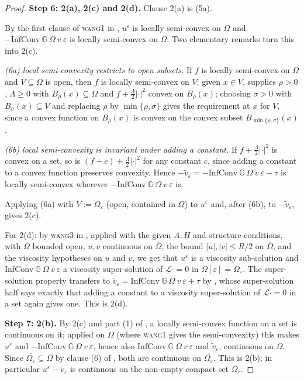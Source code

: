 \begin{proof}
\medskip\noindent\textbf{Step 6: 2(a), 2(c) and 2(d).} Clause 2(a) is (5a).

By the first clause of \textsc{wang1} in ,
$u^{\varepsilon}$ is locally semi-convex on $\Omega$ and
$-\mathrm{InfConv}\ \mathbb G\ \Omega\ v\ \varepsilon$ is locally semi-convex on $\Omega$.
Two elementary remarks turn this into 2(c).

\emph{(6a) local semi-convexity restricts to open subsets.} If $f$ is locally semi-convex on
$\Omega$ and $V\subseteq\Omega$ is open, then $f$ is locally semi-convex on $V$: given
$x\in V$,  supplies $\rho>0$, $\Lambda\ge0$ with
$B_\rho(x)\subseteq\Omega$ and $f+\tfrac\Lambda2|\cdot|^{2}$ convex on $B_\rho(x)$; choosing
$\sigma>0$ with $B_\sigma(x)\subseteq V$ and replacing $\rho$ by $\min\{\rho,\sigma\}$ gives
the requirement at $x$ for $V$, since a convex function on $B_\rho(x)$ is convex on the
convex subset $B_{\min\{\rho,\sigma\}}(x)$.

\emph{(6b) local semi-convexity is invariant under adding a constant.} If
$f+\tfrac\Lambda2|\cdot|^{2}$ is convex on a set, so is
$(f+c)+\tfrac\Lambda2|\cdot|^{2}$ for any constant $c$, since adding a constant to a convex
function preserves convexity. Hence $-\tilde v_{\varepsilon}
=-\mathrm{InfConv}\ \mathbb G\ \Omega\ v\ \varepsilon-\tau$ is locally semi-convex wherever
$-\mathrm{InfConv}\ \mathbb G\ \Omega\ v\ \varepsilon$ is.

Applying (6a) with $V:=\Omega_\varepsilon$ (open, contained in $\Omega$) to $u^{\varepsilon}$
and, after (6b), to $-\tilde v_{\varepsilon}$, gives 2(c).

For 2(d): by \textsc{wang3} in , applied with the given $A,H$ and
structure conditions, with $\Omega$ bounded open, $u,v$ continuous on $\overline\Omega$, the
bound $|u|,|v|\le R/2$ on $\overline\Omega$, and the viscosity hypotheses on $u$ and $v$,
we get that $u^{\varepsilon}$ is a viscosity sub-solution and
$\mathrm{InfConv}\ \mathbb G\ \Omega\ v\ \varepsilon$ a viscosity super-solution of
$\mathcal L\cdot=0$ in $\Omega[\varepsilon]=\Omega_\varepsilon$. The super-solution property
transfers to $\tilde v_{\varepsilon}=\mathrm{InfConv}\ \mathbb G\ \Omega\ v\ \varepsilon+\tau$
by , whose super-solution half says exactly that adding a
constant to a viscosity super-solution of $\mathcal L\cdot=0$ in a set again gives one. This
is 2(d).

\medskip\noindent\textbf{Step 7: 2(b).} By 2(c) and part (1) of
, a locally semi-convex function on a set is continuous on
it; applied on $\Omega$ (where \textsc{wang1} gives the semi-convexity) this makes
$u^{\varepsilon}$ and $-\mathrm{InfConv}\ \mathbb G\ \Omega\ v\ \varepsilon$, hence also
$\mathrm{InfConv}\ \mathbb G\ \Omega\ v\ \varepsilon$ and
$\tilde v_{\varepsilon}$, continuous on $\Omega$. Since
$\overline{\Omega_\varepsilon}\subseteq\Omega$ by clause (6) of
, both are continuous on
$\overline{\Omega_\varepsilon}$. This is 2(b); in particular
$u^{\varepsilon}-\tilde v_{\varepsilon}$ is continuous on the non-empty compact set
$\overline{\Omega_\varepsilon}$.


\end{proof}
